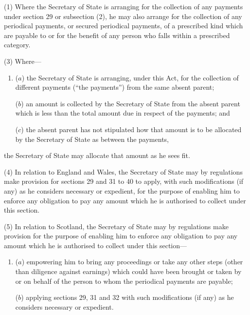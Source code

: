 \documentclass[12pt,a4paper]{article}
\begin{document}
(1) Where the Secretary of State is arranging for the collection of any payments under section 29 or subsection (2), he may also arrange for the collection of any periodical payments, or secured periodical payments, of a prescribed kind which are payable to or for the benefit of any person who falls within a prescribed category.


(3) Where—
\begin{enumerate}\item[]
($a$) the Secretary of State is arranging, under this Act, for the collection of different payments (“the payments”) from the same absent parent;

($b$) an amount is collected by the Secretary of State from the absent parent which is less than the total amount due in respect of the payments; and

($c$) the absent parent has not stipulated how that amount is to be allocated by the Secretary of State as between the payments,
\end{enumerate}
the Secretary of State may allocate that amount as he sees fit.

(4) In relation to England and Wales, the Secretary of State may by regulations make provision for sections 29 and 31 to 40 to apply, with such modifications (if any) as he considers necessary or expedient, for the purpose of enabling him to enforce any obligation to pay any amount which he is authorised to collect under this section.

(5) In relation to Scotland, the Secretary of State may by regulations make provision for the purpose of enabling him to enforce any obligation to pay any amount which he is authorised to collect under this section—
\begin{enumerate}\item[]
($a$) empowering him to bring any proceedings or take any other steps (other than diligence against earnings) which could have been brought or taken by or on behalf of the person to whom the periodical payments are payable;

($b$) applying sections 29, 31 and 32 with such modifications (if any) as he considers necessary or expedient.
\end{enumerate}
\end{document}
